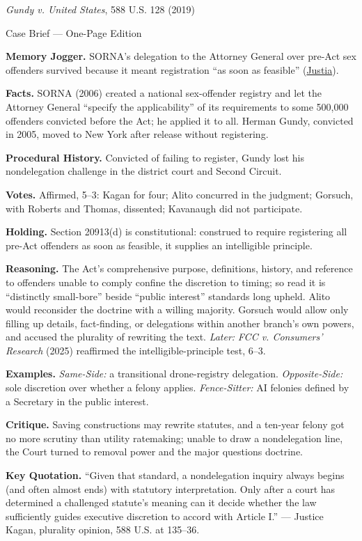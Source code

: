 \documentclass[12pt]{article}
\begin{document}
\begin{center}
{\Large \textit{Gundy v. United States}, 588 U.S. 128 (2019)\par}
\vspace{0.3em}
{\normalsize Case Brief --- One-Page Edition\par}
\end{center}

\textbf{Memory Jogger.} SORNA's delegation to the Attorney General over pre-Act sex offenders survived because it meant registration ``as soon as feasible'' (\href{https://supreme.justia.com/cases/federal/us/588/17-6086/}{Justia}).

\textbf{Facts.} SORNA (2006) created a national sex-offender registry and let the Attorney General ``specify the applicability'' of its requirements to some 500,000 offenders convicted before the Act; he applied it to all. Herman Gundy, convicted in 2005, moved to New York after release without registering.

\textbf{Procedural History.} Convicted of failing to register, Gundy lost his nondelegation challenge in the district court and Second Circuit.

\textbf{Votes.} Affirmed, 5--3: Kagan for four; Alito concurred in the judgment; Gorsuch, with Roberts and Thomas, dissented; Kavanaugh did not participate.

\textbf{Holding.} Section 20913(d) is constitutional: construed to require registering all pre-Act offenders as soon as feasible, it supplies an intelligible principle.

\textbf{Reasoning.} The Act's comprehensive purpose, definitions, history, and reference to offenders unable to comply confine the discretion to timing; so read it is ``distinctly small-bore'' beside ``public interest'' standards long upheld. Alito would reconsider the doctrine with a willing majority. Gorsuch would allow only filling up details, fact-finding, or delegations within another branch's own powers, and accused the plurality of rewriting the text. \emph{Later:} \textit{FCC v. Consumers' Research} (2025) reaffirmed the intelligible-principle test, 6--3.

\textbf{Examples.} \emph{Same-Side:} a transitional drone-registry delegation. \emph{Opposite-Side:} sole discretion over whether a felony applies. \emph{Fence-Sitter:} AI felonies defined by a Secretary in the public interest.

\textbf{Critique.} Saving constructions may rewrite statutes, and a ten-year felony got no more scrutiny than utility ratemaking; unable to draw a nondelegation line, the Court turned to removal power and the major questions doctrine.

\textbf{Key Quotation.} ``Given that standard, a nondelegation inquiry always begins (and often almost ends) with statutory interpretation. Only after a court has determined a challenged statute's meaning can it decide whether the law sufficiently guides executive discretion to accord with Article I.'' --- Justice Kagan, plurality opinion, 588 U.S. at 135--36.
\end{document}
